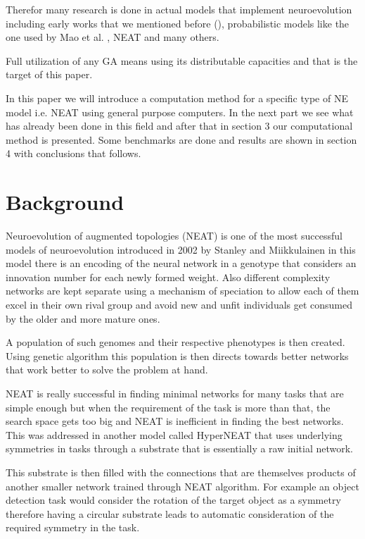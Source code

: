 \documentclass[twocolumn]{article}
\begin{document}
Therefor many research is done in actual models that implement neuroevolution including early works that we mentioned before (\cite{NEDefenitionMiikkulainen}), probabilistic models like the one used by Mao et al. \cite{OtherNESample1}, NEAT \cite{originalNEAT} and many others.

Full utilization of any GA means using its distributable capacities and that is the target of this paper.

In this paper we will introduce a computation method for a specific type of NE model i.e. NEAT using general purpose computers. In the next part we see what has already been done in this field and after that in section 3 our computational method is presented. Some benchmarks are done and results are shown in section 4 with conclusions that follows.


\section{Background}

Neuroevolution of augmented topologies (NEAT) is one of the most successful models of neuroevolution introduced in 2002 by Stanley and Miikkulainen \cite{originalNEAT} in this model there is an encoding of the neural network in a genotype that considers an innovation number for each newly formed weight. Also different complexity networks are kept separate using a mechanism of speciation to allow each of them excel in their own rival group and avoid new and unfit individuals get consumed by the older and more mature ones.

A population of such genomes and their respective phenotypes is then created. Using genetic algorithm this population is then directs towards better networks that work better to solve the problem at hand.

NEAT is really successful in finding minimal networks for many tasks that are simple enough but when the requirement of the task is more than that, the search space gets too big and NEAT is inefficient in finding the best networks. This was addressed in another model called HyperNEAT \cite{originalHyperNEAT} that uses underlying symmetries in tasks through a substrate that is essentially a raw initial network.

This substrate is then filled with the connections that are themselves products of another smaller network trained through NEAT algorithm. For example an object detection task would consider the rotation of the target object as a symmetry therefore having a circular substrate leads to automatic consideration of the required symmetry in the task.
\end{document}
